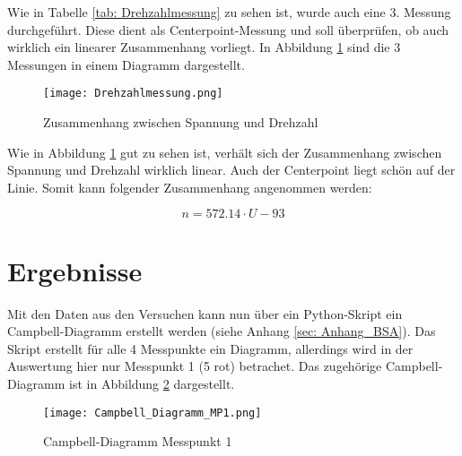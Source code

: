     \noindent
    Wie in Tabelle \ref{tab: Drehzahlmessung} zu sehen ist, wurde auch eine 3.
    Messung durchgeführt. Diese dient als Centerpoint-Messung und soll
    überprüfen, ob auch wirklich ein linearer Zusammenhang vorliegt. In Abbildung
    \ref{fig: Drehzahlmessung} sind die 3 Messungen in einem Diagramm dargestellt.

    \begin{figure}[H]
        \centering
        \texttt{[image: Drehzahlmessung.png]}
        \caption{Zusammenhang zwischen Spannung und Drehzahl}
        \label{fig: Drehzahlmessung}
    \end{figure}

    \noindent
    Wie in Abbildung \ref{fig: Drehzahlmessung} gut zu sehen ist, verhält sich
    der Zusammenhang zwischen Spannung und Drehzahl wirklich linear. Auch der
    Centerpoint liegt schön auf der Linie. Somit kann folgender Zusammenhang
    angenommen werden:

    \begin{equation*}
        n = 572.14 \cdot U - 93
    \end{equation*}

\section{Ergebnisse}
    Mit den Daten aus den Versuchen kann nun über ein Python-Skript ein
    Campbell-Diagramm erstellt werden (siehe Anhang \ref{sec: Anhang_BSA}). Das
    Skript erstellt für alle 4 Messpunkte ein Diagramm, allerdings wird in der
    Auswertung hier nur Messpunkt 1 (5 rot) betrachet. Das zugehörige
    Campbell-Diagramm ist in Abbildung \ref{fig: Campbell_Diagramm} dargestellt.

    \begin{figure}[H]
        \centering
        \texttt{[image: Campbell\_Diagramm\_MP1.png]}
        \caption{Campbell-Diagramm Messpunkt 1}
        \label{fig: Campbell_Diagramm}
    \end{figure}

